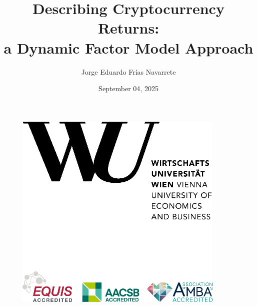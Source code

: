 \documentclass[
  12pt,
  a4paper,
  openany]{scrbook}
\title{Describing Cryptocurrency Returns:\\
a Dynamic Factor Model Approach}
\author{Jorge Eduardo Frías Navarrete}
\date{September 04, 2025}
\begin{document}
\frontmatter


\thispagestyle{empty}
\begin{figure}[h!]
    \raggedleft
    \includegraphics[scale=0.9]{pictures/WULogo.png}
\end{figure}

\vspace{1em}
\end{document}
